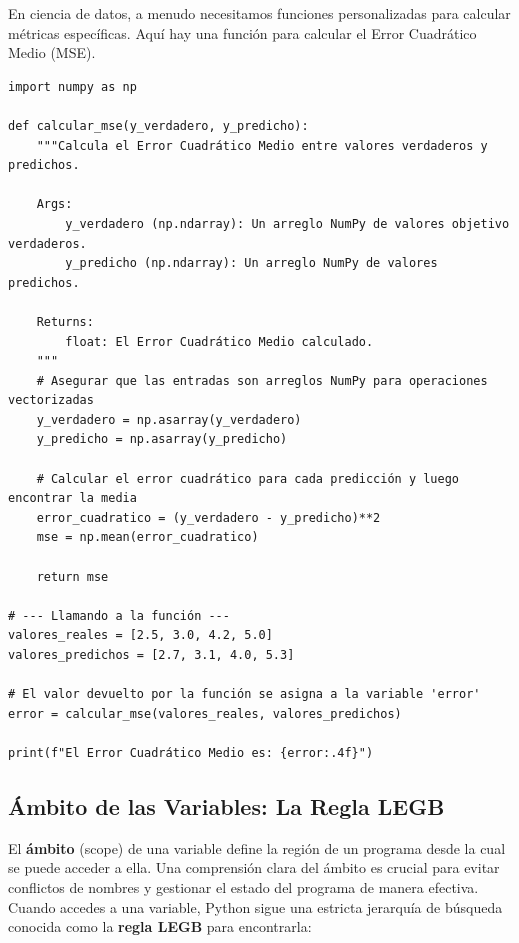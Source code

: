 \begin{example}
En ciencia de datos, a menudo necesitamos funciones personalizadas para calcular métricas específicas. Aquí hay una función para calcular el Error Cuadrático Medio (MSE).
\text{ }\begin{verbatim}
import numpy as np

def calcular_mse(y_verdadero, y_predicho):
    """Calcula el Error Cuadrático Medio entre valores verdaderos y predichos.

    Args:
        y_verdadero (np.ndarray): Un arreglo NumPy de valores objetivo verdaderos.
        y_predicho (np.ndarray): Un arreglo NumPy de valores predichos.

    Returns:
        float: El Error Cuadrático Medio calculado.
    """
    # Asegurar que las entradas son arreglos NumPy para operaciones vectorizadas
    y_verdadero = np.asarray(y_verdadero)
    y_predicho = np.asarray(y_predicho)
    
    # Calcular el error cuadrático para cada predicción y luego encontrar la media
    error_cuadratico = (y_verdadero - y_predicho)**2
    mse = np.mean(error_cuadratico)
    
    return mse

# --- Llamando a la función ---
valores_reales = [2.5, 3.0, 4.2, 5.0]
valores_predichos = [2.7, 3.1, 4.0, 5.3]

# El valor devuelto por la función se asigna a la variable 'error'
error = calcular_mse(valores_reales, valores_predichos)

print(f"El Error Cuadrático Medio es: {error:.4f}")
\end{verbatim}
\end{example}

\subsection{Ámbito de las Variables: La Regla LEGB}
\label{subsec:scope}
El \textbf{ámbito} (scope) de una variable define la región de un programa desde la cual se puede acceder a ella. Una comprensión clara del ámbito es crucial para evitar conflictos de nombres y gestionar el estado del programa de manera efectiva. Cuando accedes a una variable, Python sigue una estricta jerarquía de búsqueda conocida como la \textbf{regla LEGB} para encontrarla:

